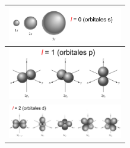             \begin{center}
                \begin{tabular}{| c |}
                    \hline
                    \includegraphics[width=5cm]{./imagenes/orbitalS.png}  \\
                    \hline
                    \hline
                    \includegraphics[width=5cm]{./imagenes/orbitalP.png} \\
                    \hline
                    \hline
                    \includegraphics[width=5cm]{./imagenes/orbitalD.png} \\
                    \hline
                \end{tabular}
            \end{center}


